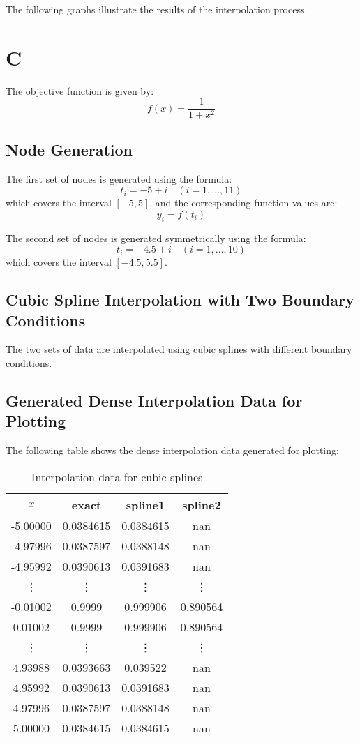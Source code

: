 \documentclass[a4paper]{article}
\begin{document}
The following graphs illustrate the results of the interpolation process.

\section*{C}
The objective function is given by:
\[
f(x) = \frac{1}{1 + x^2}
\]

\subsection*{Node Generation}
The first set of nodes is generated using the formula:
\[
t_i = -5 + i \quad (i = 1, \dots, 11)
\]
which covers the interval \([-5, 5]\), and the corresponding function values are:
\[
y_i = f(t_i)
\]

The second set of nodes is generated symmetrically using the formula:
\[
t_i = -4.5 + i \quad (i = 1, \dots, 10)
\]
which covers the interval \([-4.5, 5.5]\).

\subsection*{Cubic Spline Interpolation with Two Boundary Conditions}
The two sets of data are interpolated using cubic splines with different boundary conditions.

\subsection*{Generated Dense Interpolation Data for Plotting}
The following table shows the dense interpolation data generated for plotting:

\begin{table}[h!]
\centering
\begin{tabular}{|c|c|c|c|}
\hline
$x$ & exact & spline1 & spline2 \\
\hline
-5.00000 & 0.0384615 & 0.0384615 & nan \\
-4.97996 & 0.0387597 & 0.0388148 & nan \\
-4.95992 & 0.0390613 & 0.0391683 & nan \\
\vdots & \vdots & \vdots & \vdots \\
-0.01002   & 0.9999    & 0.999906  & 0.890564 \\
0.01002    & 0.9999    & 0.999906  & 0.890564 \\
\vdots  & \vdots  & \vdots  & \vdots \\
4.93988    & 0.0393663 & 0.039522  & nan \\
4.95992    & 0.0390613 & 0.0391683 & nan \\
4.97996    & 0.0387597 & 0.0388148 & nan \\
5.00000    & 0.0384615 & 0.0384615 & nan \\
\hline
\end{tabular}
\caption{Interpolation data for cubic splines}
\end{table}
\end{document}
